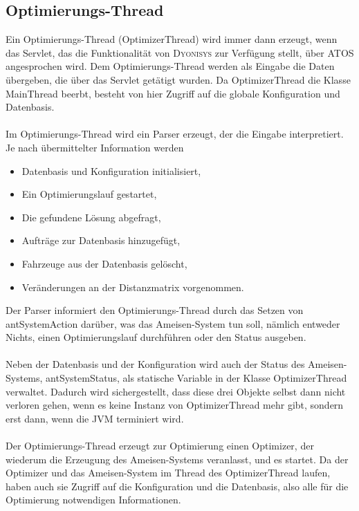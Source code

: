 \subsection{Optimierungs-Thread}
Ein Optimierungs-Thread (\textsf{OptimizerThread}) wird immer dann erzeugt, wenn das Servlet, das die Funktionalität von \textsc{Dyonisys} zur Verfügung stellt, über \textsc{ATOS} angesprochen wird. Dem Optimierungs-Thread werden als Eingabe die Daten übergeben, die über das Servlet getätigt wurden. Da \textsf{OptimizerThread} die Klasse \textsf{MainThread} beerbt, besteht von hier Zugriff auf die globale Konfiguration und Datenbasis. \\
\\
Im Optimierungs-Thread wird ein Parser erzeugt, der die Eingabe interpretiert. Je nach übermittelter Information werden
\begin{itemize}
  \item Datenbasis und Konfiguration initialisiert,
  \item Ein Optimierungslauf gestartet,
  \item Die gefundene Lösung abgefragt,
  \item Aufträge zur Datenbasis hinzugefügt,
  \item Fahrzeuge aus der Datenbasis gelöscht,
  \item Veränderungen an der Distanzmatrix vorgenommen. \\
\end{itemize}

\noindent
Der Parser informiert den Optimierungs-Thread durch das Setzen von \textsf{antSystemAction} darüber, was das Ameisen-System tun soll, nämlich entweder Nichts, einen Optimierungslauf durchführen oder den Status ausgeben. \\
\\
Neben der Datenbasis und der Konfiguration wird auch der Status des Ameisen-Systems, \textsf{antSystemStatus}, als statische Variable in der Klasse \textsf{OptimizerThread} verwaltet. Dadurch wird sichergestellt, dass diese drei Objekte selbst dann nicht verloren gehen, wenn es keine Instanz von \textsf{OptimizerThread} mehr gibt, sondern erst dann, wenn die \textsf{JVM} terminiert wird. \\
\\
Der Optimierungs-Thread erzeugt zur Optimierung einen \textsf{Optimizer}, der wiederum die Erzeugung des Ameisen-Systems veranlasst, und es startet. Da der \textsf{Optimizer} und das Ameisen-System im Thread des \textsf{OptimizerThread} laufen, haben auch sie Zugriff auf die Konfiguration und die Datenbasis, also alle für die Optimierung notwendigen Informationen.


